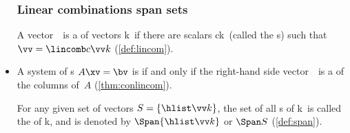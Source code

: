 \begin{itemize}
\subsubsection{Linear combinations span sets}

\itemhi A vector~\vv\ is a  of vectors \hlist\vv k\ if there are scalars \hlist ck\ (called the s) such that \(\vv=\lincomb c\vv k\) (\cref{def:lincom}).

\item A system of s \(A\xv=\bv\) is  if and only if the right-hand side vector~\bv\ is a  of the columns of~\(A\) (\cref{thm:conlincom}).

\itemhi For any given set of vectors \(S=\{\hlist\vv k\}\), the set of all s of \hlist\vv k\ is called the  of \hlist\vv k, and is denoted by \(\Span\{\hlist\vv k\}\) or \(\Span S\) (\cref{def:span}).

\end{itemize}


\makeanswers
